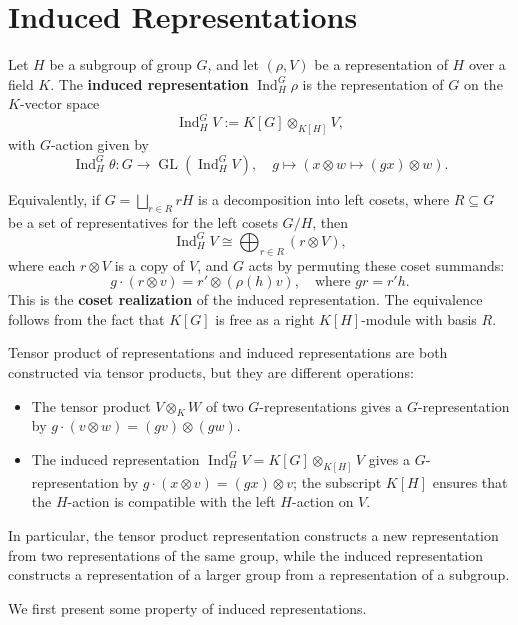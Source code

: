 \chapter{Induced Representations}


\begin{defn}
Let \(H\) be a subgroup of group $G$, and let \((\rho, V)\) be a representation of \(H\) over a field \(K\). The \textbf{induced representation} \(\operatorname{Ind}_H^G \rho\) is the representation of \(G\) on the \(K\)-vector space
\[
\operatorname{Ind}_H^G V := K[G] \otimes_{K[H]} V,
\]
with \(G\)-action given by
\[
\operatorname{Ind}_H^G \theta:G\to \operatorname{GL}(\operatorname{Ind}_H^G V),\quad g\mapsto(x \otimes w\mapsto (gx) \otimes w).
\]

Equivalently, if \(G = \bigsqcup_{r \in R} rH\) is a decomposition into left cosets, where \(R \subseteq G\) be a set of representatives for the left cosets \(G/H\), then
\[
\operatorname{Ind}_H^G V \cong \bigoplus_{r \in R} (r \otimes V),
\]
where each \(r \otimes V\) is a copy of \(V\), and \(G\) acts by permuting these coset summands:
\[
g \cdot (r \otimes v) = r' \otimes (\rho(h) v), \quad \text{where } gr = r'h.
\]
This is the \textbf{coset realization} of the induced representation. The equivalence follows from the fact that \(K[G]\) is free as a right \(K[H]\)-module with basis \(R\).


\end{defn}

\begin{remark}
Tensor product of representations and induced representations are both constructed via tensor products, but they are different operations:

\begin{itemize}
    \item The tensor product \(V \otimes_K W\) of two \(G\)-representations gives a \(G\)-representation by \(g \cdot (v \otimes w) = (gv) \otimes (gw)\).
    \item The induced representation \(\operatorname{Ind}_H^G V = K[G] \otimes_{K[H]} V\) gives a \(G\)-representation by \(g \cdot (x \otimes v) = (gx) \otimes v\); the subscript \(K[H]\) ensures that the \(H\)-action is compatible with the left \(H\)-action on \(V\).
\end{itemize}

In particular, the tensor product representation constructs a new representation from two representations of the same group, while the induced representation constructs a representation of a larger group from a representation of a subgroup.
\end{remark}
We first present some property of induced representations.

